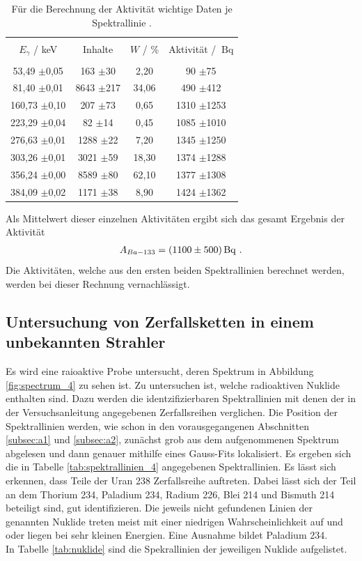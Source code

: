 \begin{table}
\centering
\caption{Für die Berechnung der Aktivität wichtige Daten je Spektrallinie \cite{sample}.}
\begin{tabular}{c c c c}
\hline \\
$E_{\gamma}$ / keV & Inhalte & $W$ / \%& Aktivität / $\SI{}{\becquerel}$\\
\hline \\
53,49 $\pm$0,05  &  163  $\pm$30 &  2,20  &  90  $\pm$75 \\ 81,40 $\pm$0,01  &  8643  $\pm$217 &  34,06  &  490  $\pm$412 \\ 160,73 $\pm$0,10  &  207  $\pm$73 &  0,65  &  1310  $\pm$1253 \\ 223,29 $\pm$0,04  &  82  $\pm$14 &  0,45  &  1085  $\pm$1010 \\ 276,63 $\pm$0,01  &  1288  $\pm$22 &  7,20  &  1345  $\pm$1250 \\ 303,26 $\pm$0,01  &  3021  $\pm$59 &  18,30  &  1374  $\pm$1288 \\ 356,24 $\pm$0,00  &  8589  $\pm$80 &  62,10  &  1377  $\pm$1308 \\ 384,09 $\pm$0,02  &  1171  $\pm$38 &  8,90  &  1424  $\pm$1362 \\ 
\hline
\end{tabular}
\label{tab:a_d_1}
\end{table}
Als Mittelwert dieser einzelnen Aktivitäten ergibt sich das gesamt Ergebnis der Aktivität
\begin{align*}
A_{Ba-133}=\SI{1100+-500}{\becquerel} \text{ .}
\end{align*}
Die Aktivitäten, welche aus den ersten beiden Spektrallinien berechnet werden, werden bei dieser Rechnung vernachlässigt.

\FloatBarrier
\subsection{Untersuchung von Zerfallsketten in einem unbekannten Strahler }
\label{subsec:a4}
Es wird eine raioaktive Probe untersucht, deren Spektrum in Abbildung \ref{fig:spectrum_4} zu sehen ist.
Zu untersuchen ist, welche radioaktiven Nuklide enthalten sind. Dazu werden die identzifizierbaren Spektrallinien
mit denen der in der Versuchsanleitung \cite{sample} angegebenen Zerfallsreihen verglichen.  Die Position
der Spektrallinien werden, wie schon in den vorausgegangenen Abschnitten \ref{subsec:a1} und \ref{subsec:a2}, zunächst
grob aus dem aufgenommenen Spektrum abgelesen und dann genauer mithilfe eines Gauss-Fits lokalisiert.
Es ergeben sich die in Tabelle \ref{tab:spektrallinien_4}  angegebenen Spektrallinien. Es lässt sich erkennen, dass
Teile der Uran 238 Zerfallsreihe auftreten. Dabei lässt sich der Teil an dem Thorium 234, Paladium 234, Radium 226,
Blei 214 und Bismuth 214 beteiligt sind, gut identifizieren. Die jeweils nicht gefundenen Linien der genannten Nuklide
treten meist mit einer niedrigen Wahrscheinlichkeit auf und oder liegen bei sehr kleinen Energien. Eine Ausnahme bildet
Paladium 234. \\
In Tabelle \ref{tab:nuklide} sind die Spekrallinien der jeweiligen Nuklide aufgelistet.

